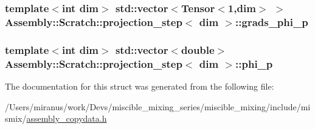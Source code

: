 \subsubsection[{grads\+\_\+phi\+\_\+p}]{\setlength{\rightskip}{0pt plus 5cm}template$<$int dim$>$ std\+::vector$<$Tensor$<$1,dim$>$ $>$ {\bf Assembly\+::\+Scratch\+::projection\+\_\+step}$<$ dim $>$\+::grads\+\_\+phi\+\_\+p}\label{struct_assembly_1_1_scratch_1_1projection__step_a75ecf1c6d8aa564824cc3b3376ca08f9}
\hypertarget{struct_assembly_1_1_scratch_1_1projection__step_a766727128326d33ecd414c713f186540}{}
\subsubsection[{phi\+\_\+p}]{\setlength{\rightskip}{0pt plus 5cm}template$<$int dim$>$ std\+::vector$<$double$>$ {\bf Assembly\+::\+Scratch\+::projection\+\_\+step}$<$ dim $>$\+::phi\+\_\+p}\label{struct_assembly_1_1_scratch_1_1projection__step_a766727128326d33ecd414c713f186540}


The documentation for this struct was generated from the following file\+:\begin{DoxyCompactItemize}
\item 
/\+Users/miranus/work/\+Devs/miscible\+\_\+mixing\+\_\+series/miscible\+\_\+mixing/include/mismix/\hyperlink{assembly__copydata_8h}{assembly\+\_\+copydata.\+h}\end{DoxyCompactItemize}
